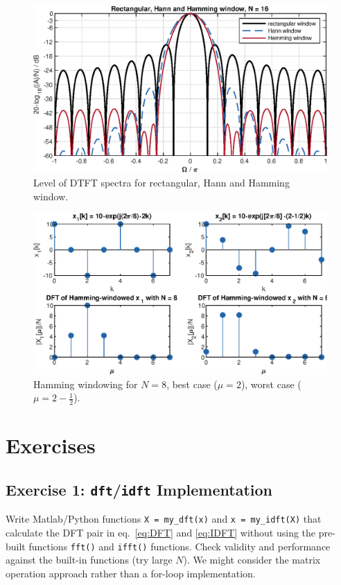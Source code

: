 \documentclass[11pt,a4paper,DIV=12]{scrartcl}
\begin{document}
\begin{figure}
		\centering
		\includegraphics[]{graphics/DTFTRectHanningHammingWin_log}
		\caption{Level of DTFT spectra for rectangular, Hann and Hamming
		window.}
		\label{DTFTRectHanningHammingWin_log}
\end{figure}
\begin{figure}
		\centering
		\includegraphics[]{graphics/DFTbestworstcase_HammWin}
		\caption{Hamming windowing for $N=8$, best case ($\mu=2$),
		worst case ($\mu=2-\frac{1}{2}$).}
		\label{DFTbestworstcase_HammWin}
\end{figure}

\section{Exercises}

\subsection*{Exercise 1: \texttt{dft}/\texttt{idft} Implementation}
Write Matlab/Python functions \texttt{X = my\_dft(x)} and \texttt{x = my\_idft(X)}
that calculate the DFT pair in eq.~\eqref{eq:DFT} and \eqref{eq:IDFT}
without using the pre-built functions \texttt{fft()} and \texttt{ifft()}
functions.
%
Check validity and performance against the built-in functions (try large $N$).
%
We might consider the matrix operation approach rather than a for-loop
implementation.
\end{document}

